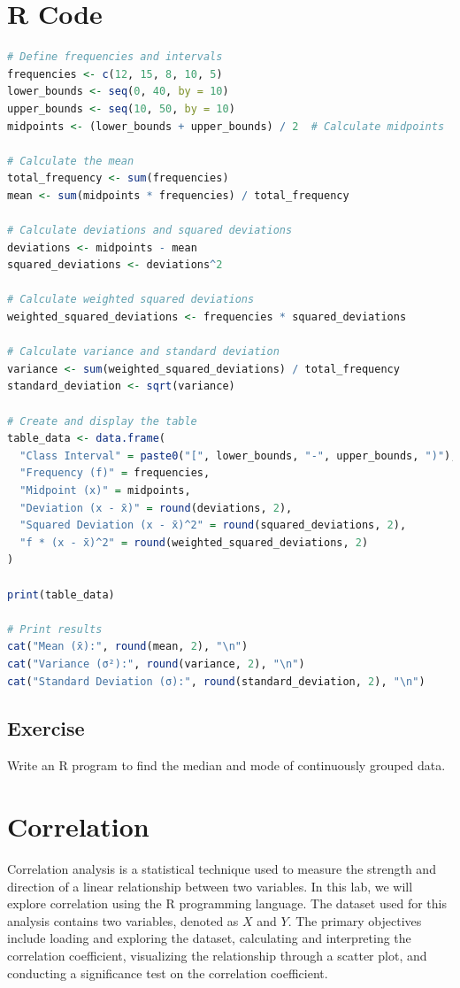 \documentclass[10pt]{book}
\begin{document}
\section*{R Code}
\begin{lstlisting}[language=R, caption={R Code for Calculating Standard deviation}, label={lst: standard deviation}]
# Define frequencies and intervals
frequencies <- c(12, 15, 8, 10, 5)
lower_bounds <- seq(0, 40, by = 10)
upper_bounds <- seq(10, 50, by = 10)
midpoints <- (lower_bounds + upper_bounds) / 2  # Calculate midpoints

# Calculate the mean
total_frequency <- sum(frequencies)
mean <- sum(midpoints * frequencies) / total_frequency

# Calculate deviations and squared deviations
deviations <- midpoints - mean
squared_deviations <- deviations^2

# Calculate weighted squared deviations
weighted_squared_deviations <- frequencies * squared_deviations

# Calculate variance and standard deviation
variance <- sum(weighted_squared_deviations) / total_frequency
standard_deviation <- sqrt(variance)

# Create and display the table
table_data <- data.frame(
  "Class Interval" = paste0("[", lower_bounds, "-", upper_bounds, ")"),
  "Frequency (f)" = frequencies,
  "Midpoint (x)" = midpoints,
  "Deviation (x - x̄)" = round(deviations, 2),
  "Squared Deviation (x - x̄)^2" = round(squared_deviations, 2),
  "f * (x - x̄)^2" = round(weighted_squared_deviations, 2)
)

print(table_data)

# Print results
cat("Mean (x̄):", round(mean, 2), "\n")
cat("Variance (σ²):", round(variance, 2), "\n")
cat("Standard Deviation (σ):", round(standard_deviation, 2), "\n")
\end{lstlisting}


\subsection{Exercise}

Write an R program to find the median and mode of continuously grouped data.

\newpage


\section{Correlation}

Correlation analysis is a statistical technique used to measure the strength and direction of a linear relationship between two variables. In this lab, we will explore correlation using the R programming language. The dataset used for this analysis contains two variables, denoted as \(X\) and \(Y\). The primary objectives include loading and exploring the dataset, calculating and interpreting the correlation coefficient, visualizing the relationship through a scatter plot, and conducting a significance test on the correlation coefficient.
\end{document}
